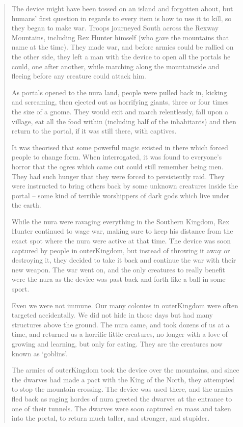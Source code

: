 \begin{multicols}{2}
\begin{quotation}
  The device might have been tossed on an island and forgotten about, but humans' first question in regards to every item is how to use it to kill, so they began to make war.
  Troops journeyed South across the Rexway Mountains, including Rex Hunter himself (who gave the mountains that name at the time).
  They made war, and before armies could be rallied on the other side, they left a man with the device to open all the portals he could, one after another, while marching along the mountainside and fleeing before any creature could attack him.

  As portals opened to the nura land, people were pulled back in, kicking and screaming, then ejected out as horrifying giants, three or four times the size of a gnome.
  They would exit and march relentlessly, fall upon a village, eat all the food within (including half of the inhabitants) and then return to the portal, if it was still there, with captives.

  It was theorised that some powerful magic existed in there which forced people to change form.
  When interrogated, it was found to everyone's horror that the ogres which came out could still remember being men.
  They had such hunger that they were forced to persistently raid.
  They were instructed to bring others back by some unknown creatures inside the portal -- some kind of terrible worshippers of dark gods which live under the earth.

  While the nura were ravaging everything in the Southern Kingdom, Rex Hunter continued to wage war, making sure to keep his distance from the exact spot where the nura were active at that time.
  The device was soon captured by people in \gls{outerKingdom}, but instead of throwing it away or destroying it, they decided to take it back and continue the war with their new weapon.
  The war went on, and the only creatures to really benefit were the nura as the device was past back and forth like a ball in some sport.

  Even we were not immune.
  Our many colonies in \gls{outerKingdom} were often targeted accidentally.
  We did not hide in those days but had many structures above the ground.
  The nura came, and took dozens of us at a time, and returned us a horrific little creatures, no longer with a love of growing and learning, but only for eating.
  They are the creatures now known as `goblins'.

  The armies of \gls{outerKingdom} took the device over the mountains, and since the dwarves had made a pact with the King of the North, they attempted to stop the mountain crossing.
  The device was used there, and the armies fled back as raging hordes of nura greeted the dwarves at the entrance to one of their tunnels.
  The dwarves were soon captured en mass and taken into the portal, to return much taller, and stronger, and stupider.


\end{quotation}
\end{multicols}
